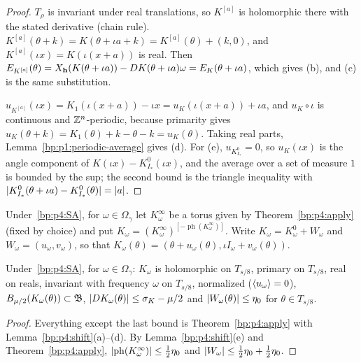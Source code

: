 \begin{proof}
\label{step:p4:shift-translation}
$T_\rho$ is invariant under real translations, so $K^{[a]}$ is holomorphic there with the stated
derivative (chain rule). $K^{[a]}(\theta+k)=K(\theta+\iota a+k)=K^{[a]}(\theta)+(k,0)$, and
$K^{[a]}(\iota x)=K(\iota(x+a))$ is real. Then
$E_{K^{[a]}}(\theta)=X_{\mathbf{h}}(K(\theta+\iota a))-DK(\theta+\iota a)\omega=E_K(\theta+\iota a)$, which
gives (b), and (c) is the same substitution.

\label{step:p4:shift-phase}
$u_{K^{[a]}}(\iota x)=K_1(\iota(x+a))-\iota x=u_K(\iota(x+a))+\iota a$, and $u_K\circ\iota$ is continuous
and $\mathbb{Z}^n$-periodic, because primarity gives $u_K(\theta+k)=K_1(\theta)+k-\theta-k=u_K(\theta)$. Taking
real parts, Lemma~\ref{bp:p1:periodic-average} gives (d). For (e), $u_{K^0_{I_*}}=0$, so $u_K(\iota x)$ is the angle component of
$K(\iota x)-K^0_{I_*}(\iota x)$, and the average over a set of measure $1$ is bounded by the sup;
the second bound is the triangle inequality with
$\lvert K^0_{I_*}(\theta+\iota a)-K^0_{I_*}(\theta)\rvert=\lvert a\rvert$.
\end{proof}

\begin{definition}\label{bp:p4:normalized-torus}
Under~\eqref{bp:p4:SA}, for $\omega\in\Omega_\gamma$ let $K^\infty_\omega$ be a torus given by
Theorem~\ref{bp:p4:apply} (fixed by choice) and put
$K_\omega=(K^\infty_\omega)^{[-\operatorname{ph}(K^\infty_\omega)]}$. Write
$K_\omega=K^0_\omega+W_\omega$ and $W_\omega=(u_\omega,v_\omega)$, so that
$K_\omega(\theta)=(\theta+u_\omega(\theta),\iota I_\omega+v_\omega(\theta))$.
\end{definition}

\begin{lemma}\label{bp:p4:normalize}
Under~\eqref{bp:p4:SA}, for $\omega\in\Omega_\gamma$: $K_\omega$ is holomorphic on $T_{s/8}$,
primary on $T_{s/8}$, real on reals, invariant with frequency $\omega$ on $T_{s/8}$, normalized
($\langle u_\omega\rangle=0$), $B_{\mu/2}(K_\omega(\theta))\subset\mathfrak{B}$,
$\lvert DK_\omega(\theta)\rvert\le\sigma_K-\mu/2$ and $\lvert W_\omega(\theta)\rvert\le\eta_0$ for
$\theta\in T_{s/8}$.
\end{lemma}

\begin{proof}
\label{step:p4:normalize-proof}
Everything except the last bound is Theorem~\ref{bp:p4:apply} with Lemma~\ref{bp:p4:shift}(a)--(d).
By Lemma~\ref{bp:p4:shift}(e) and Theorem~\ref{bp:p4:apply},
$\lvert \operatorname{ph}(K^\infty_\omega)\rvert\le\frac12\eta_0$ and
$\lvert W_\omega\rvert\le\frac12\eta_0+\frac12\eta_0$.
\end{proof}

